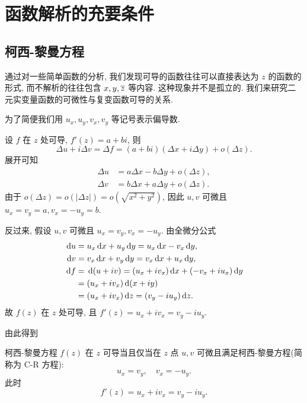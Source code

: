 \section{函数解析的充要条件}

\subsection{柯西-黎曼方程}

通过对一些简单函数的分析, 我们发现可导的函数往往可以直接表达为 $z$ 的函数的形式, 而不解析的往往包含 $x,y,\overline z$ 等内容.
这种现象并不是孤立的.
我们来研究二元实变量函数的可微性与复变函数可导的关系.

为了简便我们用 $u_x,u_y,v_x,v_y$ 等记号表示偏导数.

设 \alert{$f$ 在 $z$ 处可导}, $f'(z)=a+bi$, 则
  \[
    \Delta u+i\Delta v=\Delta f
    =(a+bi)(\Delta x+i\Delta y)+o(\Delta z).
  \]
展开可知
  \begin{align*}
    \Delta u&=a\Delta x-b\Delta y+o(\Delta z),\\
    \Delta v&=b\Delta x+a\Delta y+o(\Delta z).
  \end{align*}
由于 $o(\Delta z)=o(|\Delta z|)=o(\sqrt{x^2+y^2})$,
因此 \alert{$u,v$ 可微且 $u_x=v_y=a,v_x=-u_y=b$}.

反过来, 假设 $u,v$ 可微且 $u_x=v_y, v_x=-u_y$. 由全微分公式
  \begin{align*}
    \,\mathrm{d} u&=u_x\,\mathrm{d} x+u_y\,\mathrm{d} y
      =u_x\,\mathrm{d} x-v_x\,\mathrm{d} y,\\
    \,\mathrm{d} v&=v_x\,\mathrm{d} x+v_y\,\mathrm{d} y=v_x\,\mathrm{d} x+u_x\,\mathrm{d} y,\\
    \,\mathrm{d} f&=\,\mathrm{d} (u+iv)=(u_x+i v_x)\,\mathrm{d} x+(-v_x+i u_x)\,\mathrm{d} y\\
      &=(u_x+i v_x)\,\mathrm{d}(x+iy)\\
      &=(u_x+i v_x)\,\mathrm{d} z=(v_y-i u_y)\,\mathrm{d} z.
  \end{align*}
故 $f(z)$ 在 $z$ 处可导, 且 $f'(z)=u_x+i v_x=v_y-i u_y$.

由此得到
\begin{theorem}{柯西-黎曼方程}
	$f(z)$ 在 $z$ 可导当且仅当在 $z$ 点 $u,v$ 可微且满足柯西-黎曼方程(简称为 C-R 方程):
    \[u_x=v_y,\quad v_x=-u_y.\]
	此时
    \[f'(z)=u_x+iv_x=v_y-iu_y.\]
\end{theorem}

